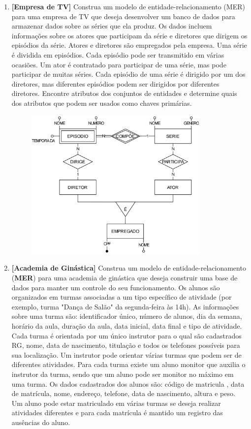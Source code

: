 \documentclass[a4paper, 12pt]{article}
\begin{document}
	\onehalfspacing
	\begin{enumerate}
		\item \textbf{[Empresa de TV]} Construa um modelo de entidade-relacionamento (MER) para uma empresa de TV que deseja desenvolver um banco de dados para armazenar dados sobre as séries que ela produz. Os dados incluem informações sobre os atores que participam da série e diretores que dirigem os episódios da série. Atores e diretores são empregados pela empresa. Uma série é dividida em episódios. Cada episódio pode ser transmitido em várias ocasiões. Um ator é contratado para participar de uma série, mas pode participar de muitas séries. Cada episódio de uma série é dirigido por um dos diretores, mas diferentes episódios podem ser dirigidos por diferentes diretores. Encontre atributos dos conjuntos de entidades e determine quais dos atributos que podem ser usados como chaves primárias.
		
		\begin{figure}[H]
			\centering
			\includegraphics[width=0.85\textwidth]{empresaTV.png}
		\end{figure}
		
		
		\item \textbf{[Academia de Ginástica]} Construa um modelo de entidade-relacionamento (\textbf{MER}) para uma academia de ginástica que deseja construir uma base de dados para manter um controle do seu funcionamento. Os alunos são organizados em turmas associadas a um tipo específico de atividade (por exemplo, turma "Dança de Salão" da segunda-feira às 14h). As informações sobre uma turma são: identificador único, número de alunos, dia da semana, horário da aula, duração da aula, data inicial, data final e tipo de atividade. Cada turma é orientada por um único instrutor para o qual são cadastrados RG, nome, data de nascimento, titulação e todos os telefones possíveis para sua localização. Um instrutor pode orientar várias turmas que podem ser de diferentes atividades. Para cada turma existe um aluno monitor que auxilia o instrutor da turma, sendo que um aluno pode ser monitor no máximo em uma turma. Os dados cadastrados dos alunos são: código de matricula , data de matrícula, nome, endereço, telefone, data de nascimento, altura e peso. Um aluno pode estar matriculado em várias turmas se deseja realizar atividades diferentes e para cada matrícula é mantido um registro das ausências do aluno.
		

\end{enumerate}
\end{document}
